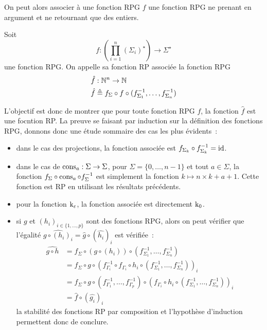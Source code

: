 On peut alors associer à une fonction RPG $f$ une fonction RPG ne prenant en
argument et ne retournant que des entiers.

\begin{definition}
  Soit
  \[f : \left(\prod_{i = 1}^n (\Sigma_i)^\star\right) \longrightarrow
  \Sigma^\star\]
  une fonction RPG. On appelle sa fonction RP associée la fonction RPG
  \begin{align*}
    \hat f &: \mathbb N^n \to \mathbb N\\
    \hat f &\triangleq f_\Sigma \circ f \circ
    (f_{\Sigma_1}^{-1},\ldots,f_{\Sigma_n}^{-1})
  \end{align*}
\end{definition}

L'objectif est donc de montrer que pour toute fonction RPG $f$, la fonction
$\hat f$ est une focntion RP. La preuve se faisant par induction sur la
définition des fonctions RPG, donnons donc une étude sommaire des cas les
plus évidents~:
\begin{itemize}
\item dans le cas des projections, la fonction associée est
  $f_{\Sigma_k}\circ f^{-1}_{\Sigma_k} = \operatorname{id}$.
\item dans le cas de $\operatorname{cons}_a : \Sigma \to \Sigma$, pour
  $\Sigma = \{0,\ldots,n-1\}$ et tout $a \in \Sigma$,
  la fonction $f_\Sigma\circ \operatorname{cons}_a\circ f_\Sigma^{-1}$ est simplement la
  fonction $k \mapsto n\times k + a + 1$. Cette fonction est RP en utilisant les
  résultats précédents.
\item pour la fonction $\operatorname{k}_\varepsilon$, la fonction associée est directement
  $\operatorname{k}_0$.
\item si $g$ et $(h_i)_{i \in \{1,\ldots,p\}}$ sont des fonctions RPG,
  alors on peut vérifier que l'égalité
  $\widehat{g\circ (h_i)_i} = \hat g \circ (\hat{h_i})_i$
  est vérifiée~:
  \begin{align*}
    \widehat{g\circ h} &= f_\Sigma\circ (g \circ (h_i)) \circ
    (f_{\Sigma_1}^{-1},\ldots,f_{\Sigma_n}^{-1})\\
    &= f_\Sigma\circ g \circ (f_{\Gamma_i}^{-1}\circ f_{\Gamma_i}\circ h_i\circ
    (f_{\Sigma_1}^{-1},\ldots,f_{\Sigma_n}^{-1}))_i\\
    &= f_\Sigma\circ g \circ (f_{\Gamma_1}^{-1},\ldots,f_{\Gamma_p}^{-1})
    \circ (f_{\Gamma_i}\circ h_i\circ
    (f_{\Sigma_1}^{-1},\ldots,f_{\Sigma_n}^{-1}))_i\\
    &= \hat f \circ (\hat{g_i})_i
  \end{align*}
  la stabilité des fonctions RP par composition et l'hypothèse d'induction
  permettent donc de conclure.
\end{itemize}

